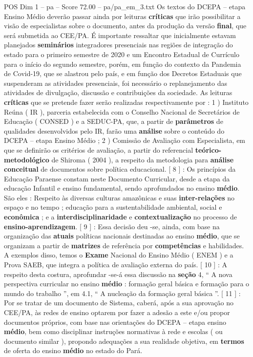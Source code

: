 \begin{textsample}{POS Dim 1 – pa – Score 72.00 – pa/pa\_em\_3.txt}
Os textos do DCEPA – etapa Ensino Médio deverão passar ainda por leituras \textbf{críticas} que irão possibilitar a visão de especialistas sobre o documento, antes da produção da versão \textbf{final}, que será submetida ao CEE/PA.
É importante ressaltar que inicialmente estavam planejados \textbf{seminários} integradores presenciais nas regiões de integração do estado para o primeiro semestre de 2020 e um Encontro Estadual de Currículo para o início do segundo semestre, porém, em função do contexto da Pandemia de Covid-19, que se alastrou pelo país, e em função dos Decretos Estaduais que suspenderam as atividades presenciais, foi necessário o replanejamento das atividades de divulgação, discussão e contribuições da sociedade.
As leituras \textbf{críticas} que se pretende fazer serão realizadas respectivamente por : 1 ) Instituto Reúna ( IR ), parceria estabelecida com o Conselho Nacional de Secretários de Educação ( CONSED ) e a SEDUC-PA, que, a partir de \textbf{parâmetros} de qualidades desenvolvidos pelo IR, farão uma \textbf{análise} sobre o conteúdo do DCEPA – etapa Ensino Médio ; 2 ) Comissão de Avaliação com Especialista, em que se definirão os critérios de avaliação, a partir do referencial \textbf{teórico-metodológico} de Shiroma ( 2004 ), a respeito da metodologia para \textbf{análise} \textbf{conceitual} de documentos sobre política educacional. [ 8 ] : Os princípios da Educação Paraense constam neste Documento Curricular, desde a etapa da educação Infantil e ensino fundamental, sendo aprofundados no ensino \textbf{médio}.
São eles : Respeito às diversas culturas amazônicas e suas \textbf{inter-relações} no espaço e no tempo ; educação para a sustentabilidade ambiental, social e \textbf{econômica} ; e a \textbf{interdisciplinaridade} e \textbf{contextualização} no processo de \textbf{ensino-aprendizagem}. [ 9 ] : Essa decisão deu -se, ainda, com base na organização das \textbf{atuais} políticas nacionais destinadas ao ensino \textbf{médio}, que se organizam a partir de \textbf{matrizes} de referência por \textbf{competências} e habilidades.
A exemplos disso, temos o \textbf{Exame} Nacional do Ensino Médio ( ENEM ) e a Prova SAEB, que integra a política de avaliação externa do país. [ 10 ] : A respeito desta costura, aprofundar -se-á essa discussão na \textbf{seção} 4, “ A nova perspectiva curricular no ensino \textbf{médio} : formação geral básica e formação para o mundo do trabalho ”, em 4.1, “ A nucleação da formação geral básica ”. [ 11 ] : Por se tratar de um documento de Sistema, caberá, após a sua aprovação no CEE/PA, às redes de ensino optarem por fazer a adesão a este e/ou propor documentos próprios, com base nas orientações do DCEPA – etapa ensino \textbf{médio}, bem como disciplinar instruções normativas à rede e escolas ( ou documento similar ), propondo adequações a sua realidade objetiva, em \textbf{termos} de oferta do ensino \textbf{médio} no estado do Pará.


\end{textsample}
